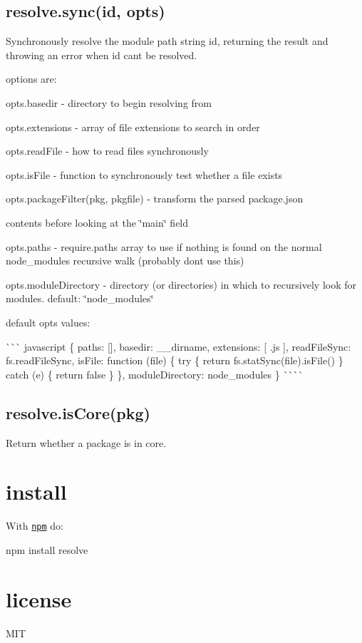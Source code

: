 \subsection*{resolve.\+sync(id, opts)}

Synchronously resolve the module path string {\ttfamily id}, returning the result and throwing an error when {\ttfamily id} can\textquotesingle{}t be resolved.

options are\+:


\begin{DoxyItemize}
\item opts.\+basedir -\/ directory to begin resolving from
\item opts.\+extensions -\/ array of file extensions to search in order
\item opts.\+read\+File -\/ how to read files synchronously
\item opts.\+is\+File -\/ function to synchronously test whether a file exists
\item {\ttfamily opts.\+package\+Filter(pkg, pkgfile)} -\/ transform the parsed package.\+json
\item contents before looking at the \char`\"{}main\char`\"{} field
\item opts.\+paths -\/ require.\+paths array to use if nothing is found on the normal node\+\_\+modules recursive walk (probably don\textquotesingle{}t use this)
\item opts.\+module\+Directory -\/ directory (or directories) in which to recursively look for modules. default\+: {\ttfamily \char`\"{}node\+\_\+modules\char`\"{}}
\end{DoxyItemize}

default {\ttfamily opts} values\+:

\`{}\`{}\`{} javascript \{ paths\+: \mbox{[}\mbox{]}, basedir\+: \+\_\+\+\_\+dirname, extensions\+: \mbox{[} \textquotesingle{}.js\textquotesingle{} \mbox{]}, read\+File\+Sync\+: fs.\+read\+File\+Sync, is\+File\+: function (file) \{ try \{ return fs.\+stat\+Sync(file).is\+File() \} catch (e) \{ return false \} \}, module\+Directory\+: \textquotesingle{}node\+\_\+modules\textquotesingle{} \} \`{}\`{}\`{}\`{}

\subsection*{resolve.\+is\+Core(pkg)}

Return whether a package is in core.

\section*{install}

With \href{https://npmjs.org}{\tt npm} do\+:


\begin{DoxyCode}
npm install resolve
\end{DoxyCode}


\section*{license}

M\+IT 